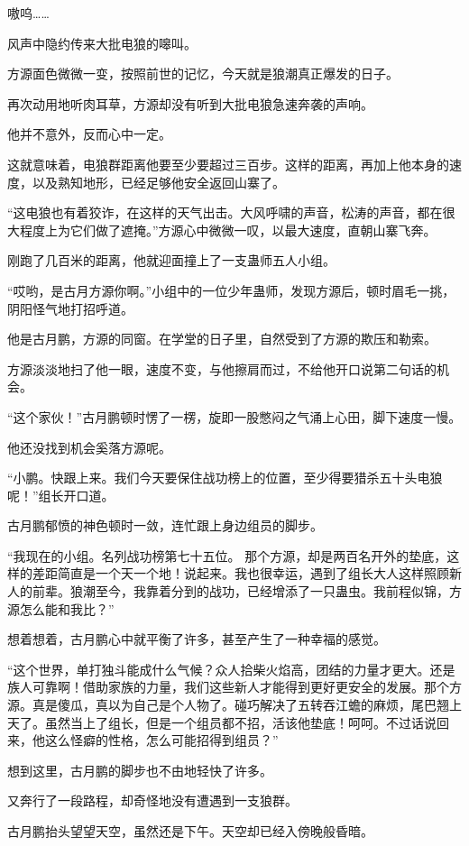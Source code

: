 \begin{this_body}
嗷呜……

风声中隐约传来大批电狼的嗥叫。

方源面色微微一变，按照前世的记忆，今天就是狼潮真正爆发的日子。

再次动用地听肉耳草，方源却没有听到大批电狼急速奔袭的声响。

他并不意外，反而心中一定。

这就意味着，电狼群距离他要至少要超过三百步。这样的距离，再加上他本身的速度，以及熟知地形，已经足够他安全返回山寨了。

“这电狼也有着狡诈，在这样的天气出击。大风呼啸的声音，松涛的声音，都在很大程度上为它们做了遮掩。”方源心中微微一叹，以最大速度，直朝山寨飞奔。

刚跑了几百米的距离，他就迎面撞上了一支蛊师五人小组。

“哎哟，是古月方源你啊。”小组中的一位少年蛊师，发现方源后，顿时眉毛一挑，阴阳怪气地打招呼道。

他是古月鹏，方源的同窗。在学堂的日子里，自然受到了方源的欺压和勒索。

方源淡淡地扫了他一眼，速度不变，与他擦肩而过，不给他开口说第二句话的机会。

“这个家伙！”古月鹏顿时愣了一楞，旋即一股憋闷之气涌上心田，脚下速度一慢。

他还没找到机会奚落方源呢。

“小鹏。快跟上来。我们今天要保住战功榜上的位置，至少得要猎杀五十头电狼呢！”组长开口道。

古月鹏郁愤的神色顿时一敛，连忙跟上身边组员的脚步。

“我现在的小组。名列战功榜第七十五位。 那个方源，却是两百名开外的垫底，这样的差距简直是一个天一个地！说起来。我也很幸运，遇到了组长大人这样照顾新人的前辈。狼潮至今，我靠着分到的战功，已经增添了一只蛊虫。我前程似锦，方源怎么能和我比？”

想着想着，古月鹏心中就平衡了许多，甚至产生了一种幸福的感觉。

“这个世界，单打独斗能成什么气候？众人拾柴火焰高，团结的力量才更大。还是族人可靠啊！借助家族的力量，我们这些新人才能得到更好更安全的发展。那个方源。真是傻瓜，真以为自己是个人物了。碰巧解决了五转吞江蟾的麻烦，尾巴翘上天了。虽然当上了组长，但是一个组员都不招，活该他垫底！呵呵。不过话说回来，他这么怪癖的性格，怎么可能招得到组员？”

想到这里，古月鹏的脚步也不由地轻快了许多。

又奔行了一段路程，却奇怪地没有遭遇到一支狼群。

古月鹏抬头望望天空，虽然还是下午。天空却已经入傍晚般昏暗。


\end{this_body}
